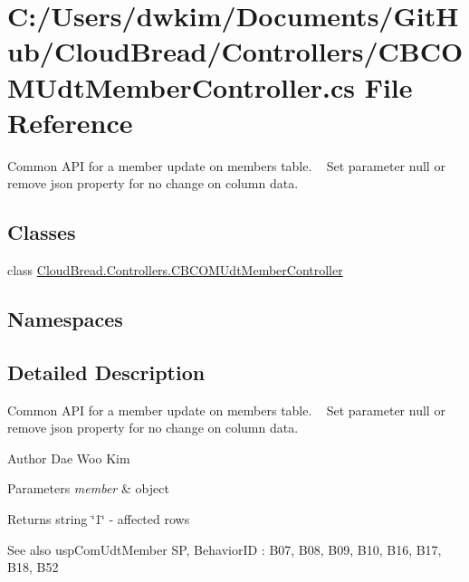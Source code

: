 \hypertarget{a00134}{}\section{C\+:/\+Users/dwkim/\+Documents/\+Git\+Hub/\+Cloud\+Bread/\+Controllers/\+C\+B\+C\+O\+M\+Udt\+Member\+Controller.cs File Reference}
\label{a00134}


Common A\+PI for a member update on members table. ~\newline
Set parameter null or remove json property for no change on column data.  


\subsection*{Classes}
\begin{DoxyCompactItemize}
\item 
class \hyperlink{a00022}{Cloud\+Bread.\+Controllers.\+C\+B\+C\+O\+M\+Udt\+Member\+Controller}
\end{DoxyCompactItemize}
\subsection*{Namespaces}
\begin{DoxyCompactItemize}
\end{DoxyCompactItemize}


\subsection{Detailed Description}
Common A\+PI for a member update on members table. ~\newline
Set parameter null or remove json property for no change on column data. 

\begin{DoxyAuthor}{Author}
Dae Woo Kim 
\end{DoxyAuthor}

\begin{DoxyParams}{Parameters}
{\em member} & object \\
\hline
\end{DoxyParams}
\begin{DoxyReturn}{Returns}
string \char`\"{}1\char`\"{} -\/ affected rows 
\end{DoxyReturn}
\begin{DoxySeeAlso}{See also}
usp\+Com\+Udt\+Member SP, Behavior\+ID \+: B07, B08, B09, B10, B16, B17, B18, B52 
\end{DoxySeeAlso}
